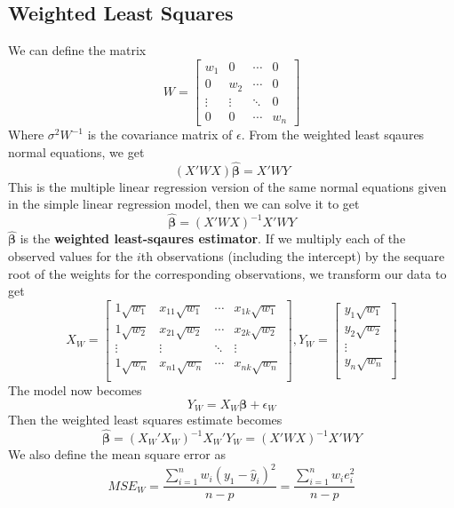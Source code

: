 \subsection{Weighted Least Squares}
We can define the matrix 
\[W = \begin{bmatrix}
    w_1 & 0 & \cdots & 0 \\
    0 & w_2 & \cdots & 0\\
    \vdots & \vdots & \ddots & 0\\
    0 & 0 & \cdots & w_n
\end{bmatrix}\]
Where $\sigma^2W^{-1}$ is the covariance matrix of $\epsilon$. From the weighted least sqaures normal equations, we get 
\[(X'WX)\boldsymbol{\hat{\beta}} = X'WY\]
This is the multiple linear regression version of the same normal equations given in the simple linear regression model, then we can solve it to get 
\[\boldsymbol{\hat{\beta}} = (X'WX)^{-1}X'WY\]
$\boldsymbol{\hat{\beta}}$ is the \textbf{weighted least-sqaures estimator}. If we multiply each of the observed values for the $i$th observations (including the intercept) by the sequare root of the weights for the corresponding observations, we transform our data to get
\renewcommand{\arraystretch}{1.5}
\[X_W = \begin{bmatrix}
    1\sqrt{w_1} & x_{11}\sqrt{w_1} & \cdots & x_{1k}\sqrt{w_1}\\
    1\sqrt{w_2} & x_{21}\sqrt{w_2} & \cdots & x_{2k}\sqrt{w_2}\\
    \vdots & \vdots & \ddots & \vdots\\
    1\sqrt{w_n} & x_{n1}\sqrt{w_n} & \cdots & x_{nk}\sqrt{w_n}\\
\end{bmatrix}, Y_W = \begin{bmatrix}
    y_1\sqrt{w_1}\\
    y_2\sqrt{w_2}\\
    \vdots\\
    y_n\sqrt{w_n}\\
\end{bmatrix}\]
The model now becomes 
\[Y_W = X_W\boldsymbol{\beta} + \epsilon_W\]
Then the weighted least squares estimate becomes 
\[\boldsymbol{\hat{\beta}} = (X_W'X_W)^{-1}X_W'Y_W = (X'WX)^{-1}X'WY\]
We also define the mean square error as 
\[MSE_W = \frac{\sum_{i=1}^n w_i(y_1 - \hat{y}_i)^2}{n-p} = \frac{\sum_{i=1}^nw_ie_i^2}{n-p}\]